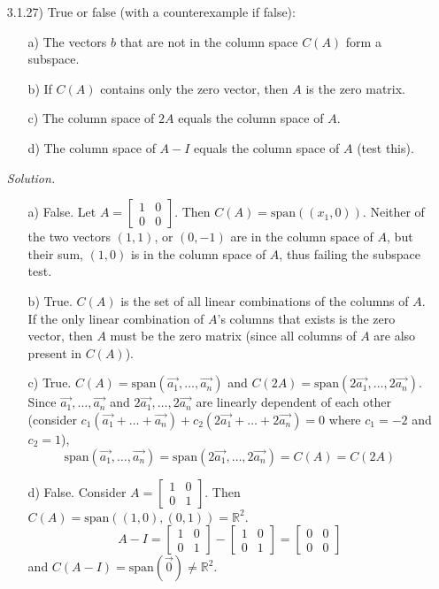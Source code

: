 \documentclass[12pt]{article}
\begin{document}
\begin{itemize}
\item[3.1.27)] True or false (with a counterexample if false):
\begin{itemize}
\item[a)] The vectors $b$ that are not in the column space $C(A)$ form a subspace.
\item[b)] If $C(A)$ contains only the zero vector, then $A$ is the zero matrix.
\item[c)] The column space of $2A$ equals the column space of $A$.
\item[d)] The column space of $A-I$ equals the column space of $A$ (test this).
\end{itemize}
\textit{Solution.}
\begin{itemize}
\item[a)] False. Let $A=\left[\begin{array}{ccc} 1 & 0 \\ 0 & 0 \end{array}\right]$. Then $C(A)=\text{span}((x_1,0))$. Neither of the two vectors $(1,1)$, or $(0, -1)$ are in the column space of $A$, but their sum, $(1,0)$ is in the column space of $A$, thus failing the subspace test.
\item[b)] True. $C(A)$ is the set of all linear combinations of the columns of $A$. If the only linear combination of $A$'s columns that exists is the zero vector, then $A$ must be the zero matrix (since all columns of $A$ are also present in $C(A)$). 
\item[c)] True. $C(A)=\text{span}(\vec{a_1},\ldots,\vec{a_n})$ and $C(2A)=\text{span}(2\vec{a_1},\ldots,2\vec{a_n})$. Since $\vec{a_1},\ldots,\vec{a_n}$ and $2\vec{a_1},\ldots,2\vec{a_n}$ are linearly dependent of each other (consider $c_1(\vec{a_1}+\ldots+\vec{a_n})+c_2(2\vec{a_1}+\ldots+2\vec{a_n})=0$ where $c_1=-2$ and $c_2=1$), \[\text{span}(\vec{a_1},\ldots,\vec{a_n})=\text{span}(2\vec{a_1},\ldots,2\vec{a_n})=C(A)=C(2A)\]
\item[d)] False. Consider $A=\left[\begin{array}{cc} 1 & 0 \\ 0 & 1\end{array}\right]$. Then $C(A)=\text{span}((1,0),(0,1))=\mathbb{R}^2$.\[A-I=\left[\begin{array}{cc} 1 & 0 \\ 0 & 1\end{array}\right]-\left[\begin{array}{cc} 1 & 0 \\ 0 & 1\end{array}\right]=\left[\begin{array}{cc} 0 & 0 \\ 0 & 0\end{array}\right]\] and $C(A-I)=\text{span}(\vec{0})\neq\mathbb{R}^2$.
\end{itemize}


\end{itemize}
\end{document}

